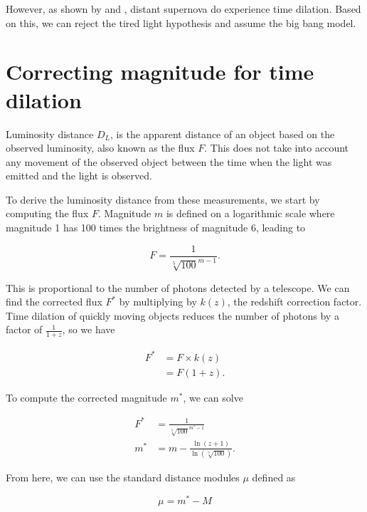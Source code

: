 \documentclass{article}
\begin{document}
However, as shown by \citet{blondin2008} and \citet{white2024}, distant
supernova do experience time dilation. Based on this, we can reject the tired
light hypothesis and assume the big bang model.

\section{Correcting magnitude for time dilation}

Luminosity distance $D_L$, is the apparent distance of an object based on the
observed luminosity, also known as the flux $F$. This does not take into
account any movement of the observed object between the time when the light was
emitted and the light is observed.

To derive the luminosity distance from these measurements, we start
by computing the flux $F$. Magnitude $m$ is defined on a logarithmic scale
where magnitude 1 has 100 times the brightness of magnitude 6, leading to

\begin{equation}
  F = \frac{1}{\sqrt[5]{100}^{m - 1}}.
\end{equation}

This is proportional to the number of photons detected by a telescope. We can
find the corrected flux $F^*$ by multiplying by $k(z)$, the redshift correction
factor. Time dilation of quickly moving objects reduces the number of photons
by a factor of $\frac{1}{1 + z}$, so we have

\begin{equation}
\begin{aligned}
  F^* &= F \times k(z) \\
      &= F (1 + z).
\end{aligned}
\end{equation}

To compute the corrected magnitude $m^*$, we can solve

\begin{equation}
\begin{aligned}
   F^* &= \frac{1}{\sqrt[5]{100}^{m^* - 1}} \\
   m^* &= m - \frac{\ln{(z + 1)}}{\ln{(\sqrt[5]{100})}}.
\end{aligned}
\end{equation}

From here, we can use the standard distance modules $\mu$ defined as

\begin{equation}
  \mu = m^* - M
\end{equation}
\end{document}
